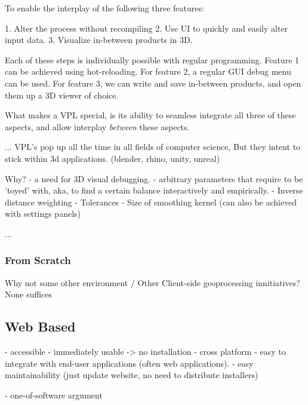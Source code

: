 To enable the interplay of the following three features: 

1. Alter the process without recompiling
2. Use UI to quickly and easily alter input data.
3. Visualize in-between products in 3D. 

Each of these steps is individually possible with regular programming. Feature 1 can be achieved using hot-reloading. For feature 2, a regular GUI debug menu can be used. For feature 3, we can write and save in-between products, and open them up a 3D viewer of choice. 

What makes a VPL special, is its ability to seamless integrate all three of these aspects, and allow interplay \emph{between} these aspects.

...
VPL's pop up all the time in all fields of computer science, But they intent to stick within 3d applications. (blender, rhino, unity, unreal)

Why? 
- a need for 3D visual debugging. 
- arbitrary parameters that require to be 'toyed' with, aka, to find a certain balance interactively and empirically.
  - Inverse distance weighting
  - Tolerances
  - Size of smoothing kernel
(can also be achieved with settings panels)

...


\subsubsection*{From Scratch}

Why not some other environment / Other Client-side geoprocessing innitiatives?
None suffices



\subsection{Web Based}

- accessible
    - immediately usable -> no installation
    - cross platform
    - easy to integrate with end-user applications (often web applications).
    - easy maintainability (just update website, no need to distribute installers)

- one-of-software argument

